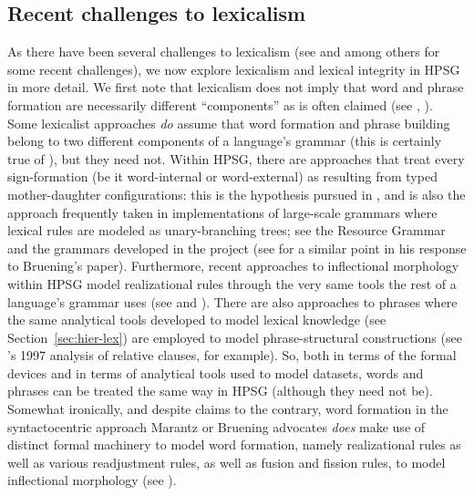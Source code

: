 \documentclass[output=paper
	        ,collection
	        ,collectionchapter
 	        ,biblatex
                ,babelshorthands
                ,newtxmath
                ,draftmode
                ,colorlinks, citecolor=brown
]{langscibook}
\begin{document}
\subsection{Recent challenges to lexicalism}

As there have been several challenges to lexicalism (see \citealt{Bruening2018} and  \citealt{Haspelmath2011} among others for some recent challenges), we now explore lexicalism and  lexical integrity in HPSG in more detail. We first note that lexicalism does not imply that word and phrase formation are necessarily different ``components'' as is often claimed (see \citealt{Marantz1997}, \citealt{Bruening2018}). Some lexicalist approaches \emph{do} assume that word formation and phrase building belong to two different components of a language's grammar (this is certainly true of \citealt{Jackendoff1975}), but they need not. Within HPSG, there are approaches that treat every sign-formation (be it word-internal or word-external) as resulting from typed mother-daughter configurations: this is the hypothesis pursued in \citealt{Koenig1999c}, and is also the approach frequently taken in implementations of large-scale grammars where lexical rules are modeled as unary-branching trees; see the  Resource Grammar \citep{Copestake2002} and the grammars developed in the  project \citep{Mueller2015}  (see \citealt[58]{MuellerLexicalism} for a similar point in his response to Bruening's paper). Furthermore, recent approaches to inflectional morphology within HPSG model realizational rules through the very same tools the rest of a language's grammar uses (see \citealt{CrysmannandBonami2016} and ).  There are also approaches to phrases where the same analytical tools developed to model lexical knowledge (see Section~\ref{sec:hier-lex}) are employed to model phrase-structural constructions (see \citeauthor{Sag1997}'s 1997 analysis of relative clauses, for example). So, both in terms of the formal devices and in terms of analytical tools used to model datasets, words and phrases can be treated the same way in HPSG (although they need not be). Somewhat ironically, and despite claims to the contrary, word formation in the syntactocentric approach Marantz or Bruening advocates \emph{does} make use of distinct formal machinery to model word formation, namely realizational rules as well as various readjustment rules, as well as fusion and fission rules, to model inflectional morphology (see \citealt{HalleandMarantz1993,Embick2015}).
\end{document}
